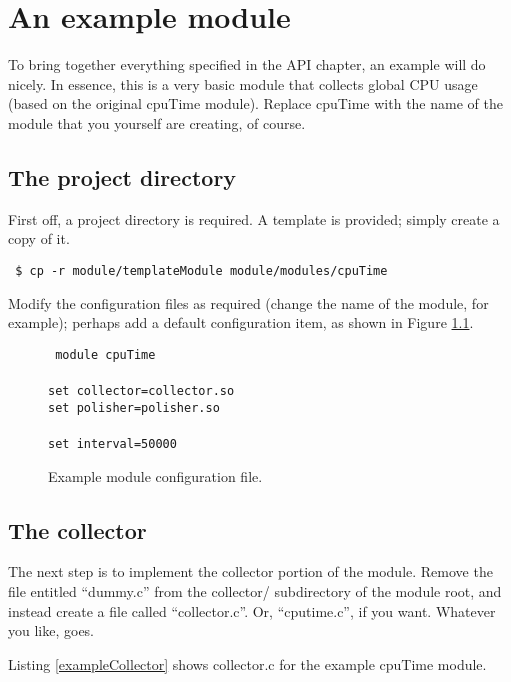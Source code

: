 \chapter{An example module}
To bring together everything specified in the API chapter, an example will do nicely. In essence, this is a very basic
module that collects global CPU usage (based on the original cpuTime module). Replace cpuTime with the name of the
module that you yourself are creating, of course.

\section{The project directory}
First off, a project directory is required. A template is provided; simply create a copy of it.

\small{\texttt{
\$ cp -r module/templateModule module/modules/cpuTime
}}

Modify the configuration files as required (change the name of the module, for example); perhaps add a default
configuration item, as shown in Figure \ref{exampleModuleConfig}. 

\begin{figure}[h]
  \small{\texttt{%
module cpuTime \\
\\
set collector=collector.so \\
set polisher=polisher.so \\
\\
set interval=50000
  }}
  \caption{Example module configuration file.\label{exampleModuleConfig}}
\end{figure}

\section{The collector}

The next step is to implement the collector portion of the module. Remove the file entitled ``dummy.c'' from the
collector/ subdirectory of the module root, and instead create a file called ``collector.c''. Or, ``cputime.c'', if you
want. Whatever you like, goes.

Listing \ref{exampleCollector} shows collector.c for the example cpuTime module.


